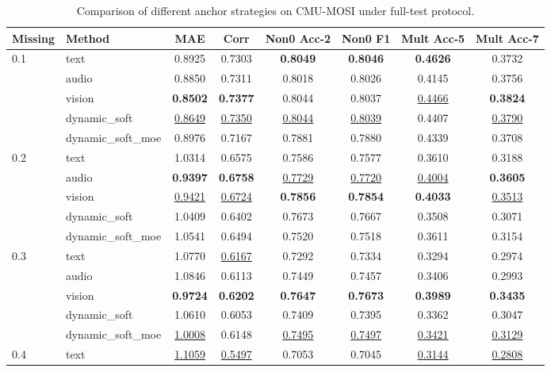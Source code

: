 \begin{table}[t]
\centering
\small
\caption{Comparison of different anchor strategies on CMU-MOSI under full-test protocol.}
\label{tab:main_missing_sweep}
\begin{tabular}{llcccccc}
\toprule
Missing & Method & MAE & Corr & Non0 Acc-2 & Non0 F1 & Mult Acc-5 & Mult Acc-7 \\
\midrule
0.1 & text & 0.8925 & 0.7303 & \textbf{0.8049} & \textbf{0.8046} & \textbf{0.4626} & 0.3732 \\
 & audio & 0.8850 & 0.7311 & 0.8018 & 0.8026 & 0.4145 & 0.3756 \\
 & vision & \textbf{0.8502} & \textbf{0.7377} & 0.8044 & 0.8037 & \underline{0.4466} & \textbf{0.3824} \\
 & dynamic_soft & \underline{0.8649} & \underline{0.7350} & \underline{0.8044} & \underline{0.8039} & 0.4407 & \underline{0.3790} \\
 & dynamic_soft_moe & 0.8976 & 0.7167 & 0.7881 & 0.7880 & 0.4339 & 0.3708 \\
\midrule
0.2 & text & 1.0314 & 0.6575 & 0.7586 & 0.7577 & 0.3610 & 0.3188 \\
 & audio & \textbf{0.9397} & \textbf{0.6758} & \underline{0.7729} & \underline{0.7720} & \underline{0.4004} & \textbf{0.3605} \\
 & vision & \underline{0.9421} & \underline{0.6724} & \textbf{0.7856} & \textbf{0.7854} & \textbf{0.4033} & \underline{0.3513} \\
 & dynamic_soft & 1.0409 & 0.6402 & 0.7673 & 0.7667 & 0.3508 & 0.3071 \\
 & dynamic_soft_moe & 1.0541 & 0.6494 & 0.7520 & 0.7518 & 0.3611 & 0.3154 \\
\midrule
0.3 & text & 1.0770 & \underline{0.6167} & 0.7292 & 0.7334 & 0.3294 & 0.2974 \\
 & audio & 1.0846 & 0.6113 & 0.7449 & 0.7457 & 0.3406 & 0.2993 \\
 & vision & \textbf{0.9724} & \textbf{0.6202} & \textbf{0.7647} & \textbf{0.7673} & \textbf{0.3989} & \textbf{0.3435} \\
 & dynamic_soft & 1.0610 & 0.6053 & 0.7409 & 0.7395 & 0.3362 & 0.3047 \\
 & dynamic_soft_moe & \underline{1.0008} & 0.6148 & \underline{0.7495} & \underline{0.7497} & \underline{0.3421} & \underline{0.3129} \\
\midrule
0.4 & text & \underline{1.1059} & \underline{0.5497} & 0.7053 & 0.7045 & \underline{0.3144} & \underline{0.2808} \\

\end{tabular}
\end{table}
